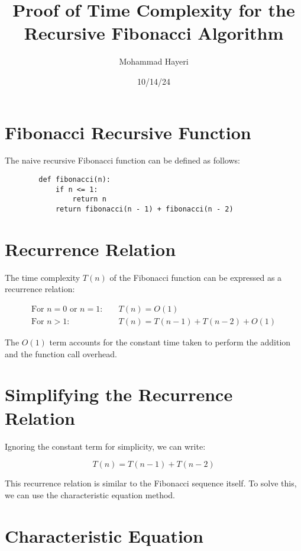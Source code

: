 \documentclass{article}
\begin{document}
	
	\title{Proof of Time Complexity for the Recursive Fibonacci Algorithm}
	\author{Mohammad Hayeri}
	\date{10/14/24}
	\maketitle
	
	\section*{Fibonacci Recursive Function}
	
	The naive recursive Fibonacci function can be defined as follows:
	
	\begin{verbatim}
		def fibonacci(n):
		    if n <= 1:
				return n
			return fibonacci(n - 1) + fibonacci(n - 2)
	\end{verbatim}
	
	\section*{Recurrence Relation}
	
	The time complexity $ T(n) $ of the Fibonacci function can be expressed as a recurrence relation:
	
	\begin{align*}
		\text{For } n = 0 \text{ or } n = 1: & \quad T(n) = O(1) \\
		\text{For } n > 1: & \quad T(n) = T(n - 1) + T(n - 2) + O(1)
	\end{align*}
	
	The $ O(1) $ term accounts for the constant time taken to perform the addition and the function call overhead.
	
	\section*{Simplifying the Recurrence Relation}
	
	Ignoring the constant term for simplicity, we can write:
	
	$$T(n) = T(n - 1) + T(n - 2)$$
	
	This recurrence relation is similar to the Fibonacci sequence itself. To solve this, we can use the characteristic equation method.
	
	\section*{Characteristic Equation}
	
\end{document}
